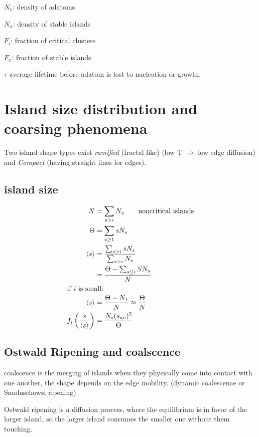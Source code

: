 \documentclass[article,oneside]{memoir}
\begin{document}
$N_1$: density of adatoms

$N_{x}$: density of stable islands

$F_i$: fraction of critical clusters

$F_{x}$: fraction of stable islands

$\tau$ average lifetime before adatom is lost to nucleation or growth.


\section{Island size distribution and coarsing phenomena}

Two island shape types exist \emph{ramified} (fractal like) (low T $\rightarrow$ low edge diffusion) and \emph{Compact} (having straight lines for edges).
\subsection{island size}

\begin{align*}
        N&=\sum_{s>i}N_s\qquad \textup{noncritical islands}\\
        \Theta&=\sum_{s\geq 1}sN_{s}\\
        \langle s\rangle &= \frac{\sum_{s>i}sN_s}{\sum_{s>i}N_s}\\
        &=\frac{\Theta-\sum_{s\leq i}SN_{s}}{N}\\
        \intertext{if $i$ is small:}
        \langle s\rangle &= \frac{\Theta-N_1}{N}\approx \frac{\Theta}{N}\\
        f_{i}\left( \frac{s}{\langle s\rangle} \right)&=\frac{N_s(s_{av})^{2}}{\Theta}
\end{align*}

\subsection{Ostwald Ripening and coalscence}

coalscence is the merging of islands when they physically come into contact with one another, the shape depends on the edge mobility. (dynamic coalescence or Smoluschowsi ripening)


Ostwald ripening is a diffusion process, where the equilibrium is in favor of the larger island, so the larger island consumes the smaller one without them touching.
\end{document}
